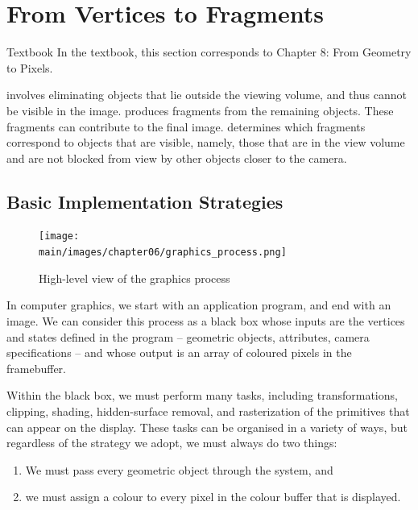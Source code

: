 \documentclass[../COS3712_Notes.tex]{subfiles}
\begin{document}
  \setcounter{chapter}{5}
  \chapter{From Vertices to Fragments}
    \begin{sidenote}{Textbook}
      In the textbook, this section corresponds to Chapter 8: From Geometry to Pixels.
    \end{sidenote}

     involves eliminating objects that lie outside the viewing volume,
    and thus cannot be visible in the image.
     produces fragments from the remaining objects.
    These fragments can contribute to the final image.
     determines which fragments correspond to objects
    that are visible, namely, those that are in the view volume and are not blocked
    from view by other objects closer to the camera.

    \section{Basic Implementation Strategies}
      \begin{figure}
        \begin{center}
          \texttt{[image: \\main/images/chapter06/graphics\_process.png]}
        \end{center}
        \caption{High-level view of the graphics process}
      \end{figure}

      In computer graphics, we start with an application program, and end with an image.
      We can consider this process as a black box whose inputs are the vertices and states
      defined in the program -- geometric objects, attributes, camera specifications --
      and whose output is an array of coloured pixels in the framebuffer.

      Within the black box, we must perform many tasks, including transformations,
      clipping, shading, hidden-surface removal, and rasterization of the primitives
      that can appear on the display.
      These tasks can be organised in a variety of ways, but regardless of the strategy
      we adopt, we must always do two things:
      \begin{enumerate}[nosep]
        \item We must pass every geometric object through the system, and
        \item we must assign a colour to every pixel in the colour buffer that is displayed.
      \end{enumerate}
\end{document}
